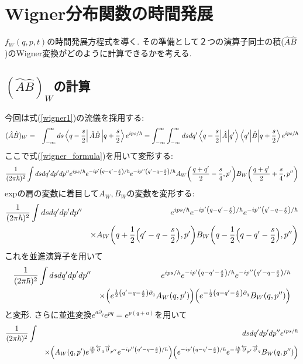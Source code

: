 \documentclass[10.5pt,a4paper]{jsarticle}
\begin{document}
\section{Wigner分布関数の時間発展}
$f_W(q, p, t)$の時間発展方程式を導く. その準備として２つの演算子同士の積($\hat{A}\hat{B}$)のWigner変換がどのように計算できるかを考える. 
\subsection{$(\hat{A}\hat{B})_W$の計算}
今回は式(\ref{wigner1})の流儀を採用する:
\begin{eqnarray}
  (\hat{A}\hat{B})_W &=& \int_{-\infty}^{\infty}ds \bra{q-\frac{s}{2}}\hat{A}\hat{B}\ket{q+\frac{s}{2}}e^{ips/\hbar}
  = \int_{-\infty}^{\infty}\int_{-\infty}^{\infty}ds dq' \mel**{q-\frac{s}{2}}{\hat{A}}{q'}\mel**{q'}{\hat{B}}{q+\frac{s}{2}}e^{ips/\hbar}\label{wigner_start}
\end{eqnarray}
ここで式(\ref{wigner_formula})を用いて変形する:
\begin{eqnarray}
  \frac{1}{(2\pi\hbar)^2}\int ds dq' dp' dp'' e^{ips/\hbar}e^{-ip'\qty(q-q'-\frac{s}{2})/\hbar} e^{-ip''\qty(q'-q-\frac{s}{2})/\hbar}A_W\pqty{\frac{q+q'}{2} - \frac{s}{4}, p'}B_W\qty(\frac{q+q'}{2} + \frac{s}{4}, p'')
\end{eqnarray}
expの肩の変数に着目して$A_W, B_W$の変数を変形する:
\begin{eqnarray}
  \nonumber\frac{1}{(2\pi\hbar)^2}\int ds dq' dp' dp'' &&e^{ips/\hbar}e^{-ip'\qty(q-q'-\frac{s}{2})/\hbar} e^{-ip''\qty(q'-q-\frac{s}{2})/\hbar}\\
 && \times A_W\qty(q + \frac{1}{2}\pqty{q'-q-\frac{s}{2}}, p')B_W\qty(q - \frac{1}{2}\pqty{q-q'-\frac{s}{2}}, p'')
\end{eqnarray}
これを並進演算子を用いて
\begin{eqnarray}
  \nonumber\frac{1}{(2\pi\hbar)^2}\int ds dq' dp' dp'' &&e^{ips/\hbar}e^{-ip'\qty(q-q'-\frac{s}{2})/\hbar}e^{-ip''\qty(q'-q-\frac{s}{2})/\hbar}\\
  &&\times\qty(e^{\frac{1}{2}\pqty{q'-q-\frac{s}{2}}\partial_q}A_W\qty(q, p'))\qty(e^{-\frac{1}{2}\pqty{q-q'-\frac{s}{2}}\partial_q}B_W\qty(q, p''))
\end{eqnarray}
と変形. さらに並進変換$e^{a\partial_q}e^{pq} = e^{p(q+a)}$を用いて
\begin{eqnarray}
  \nonumber\frac{1}{(2\pi\hbar)^2}\int&& ds dq' dp' dp'' e^{ips/\hbar}\\
  &&\times\qty(A_W\qty(q, p')e^{\frac{i\hbar}{2}\overleftarrow{\partial}_q\overrightarrow{\partial}_{p''}}e^{-ip''\qty(q'-q-\frac{s}{2})/\hbar})\qty(e^{-ip'\qty(q-q'-\frac{s}{2})/\hbar}e^{-\frac{i\hbar}{2}\overleftarrow{\partial}_{p'}\overrightarrow{\partial}_{q}}B_W\qty(q, p''))
\end{eqnarray}
\end{document}
